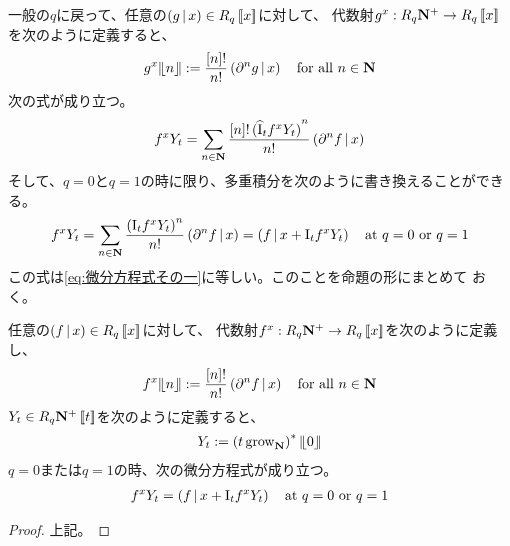 {	一般の$q$に戻って、任意の$\mathinner{({g{\,|\,}x})}\in R_q\mathinner{[\![{x}]\!]}$に対して、
	代数射$g^x:R_q\mathbf{N}^+\to R_q\mathinner{[\![{x}]\!]}$を次のように定義すると、
	\begin{equation*}\begin{split}
		g^x{|\!\lfloor{n}\rfloor\!|} := \frac{{\mathinner{[{n}]}}!}{n!}\mathinner{({\partial^ng{\,|\,}x})}
		\quad\text{for all } n\in\mathbf{N}
	\end{split}\end{equation*}
	次の式が成り立つ。
	\begin{equation*}\begin{split}
		f^xY_t = \sum_{n\in\mathbf{N}}\frac{{\mathinner{[{n}]}}!\mathinner{({{{\widehat{\mathinner{\operatorname{I}}}}}_tf^xY_t})}^n}{n!}
			\mathinner{({\partial^nf{\,|\,}x})}
	\end{split}\end{equation*}
	そして、$q=0$と$q=1$の時に限り、多重積分を次のように書き換えることができる。
	\begin{equation*}\begin{split}
		f^xY_t = \sum_{n\in\mathbf{N}}\frac{\mathinner{({{\mathinner{\operatorname{I}}}_tf^xY_t})}^n}{n!}
			\mathinner{({\partial^nf{\,|\,}x})}
		= \mathinner{({f{\,|\,}x + {\mathinner{\operatorname{I}}}_tf^xY_t})}
		\quad\text{at } q = 0 \text{ or } q = 1
	\end{split}\end{equation*}
	この式は\eqref{eq:微分方程式その一}に等しい。このことを命題の形にまとめて
	おく。

	\begin{proposition}[微分方程式と二分木]\label{prop:微分方程式と二分木} %
		任意の$\mathinner{({f{\,|\,}x})}\in R_q\mathinner{[\![{x}]\!]}$に対して、
		代数射$f^x:R_q\mathbf{N}^+\to R_q\mathinner{[\![{x}]\!]}$を次のように定義し、
		\begin{equation*}\begin{split}
			f^x{|\!\lfloor{n}\rfloor\!|} := \frac{{\mathinner{[{n}]}}!}{n!}\mathinner{({\partial^nf{\,|\,}x})}
			\quad\text{for all } n\in\mathbf{N}
		\end{split}\end{equation*}
		$Y_t\in R_q\mathbf{N}^+\mathinner{[\![{t}]\!]}$を次のように定義すると、
		\begin{equation*}\begin{split}
			Y_t := \mathinner{({t\,{\mathinner{\operatorname{grow}}}_{\ensuremath{\mathbf{N}}}})}^*{|\!\lfloor{0}\rfloor\!|}
		\end{split}\end{equation*}
		$q=0$または$q=1$の時、次の微分方程式が成り立つ。
		\begin{equation*}\begin{split}
			f^xY_t = \mathinner{({f{\,|\,}x + {\mathinner{\operatorname{I}}}_tf^xY_t})} 
			\quad\text{at } q = 0 \text{ or } q = 1
		\end{split}\end{equation*}
	\end{proposition} %
	\begin{proof} %
		上記。
	\end{proof} %
}
